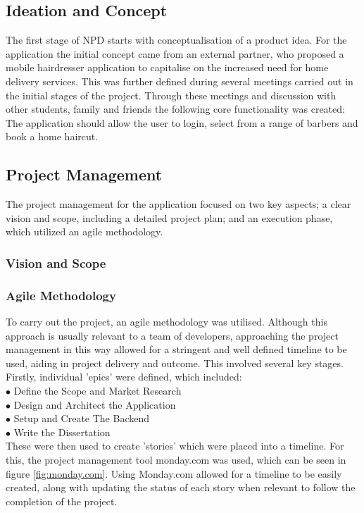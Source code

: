 \documentclass[12pt]{article}
\begin{document}
	
	\subsection{Ideation and Concept}
	The first stage of NPD starts with conceptualisation of a product idea. For the application the initial concept came from an external partner, who proposed a mobile hairdresser application to capitalise on the increased need for home delivery services. This was further defined during several meetings carried out in the initial stages of the project. Through these meetings and discussion with other students, family and friends the following core functionality was created:
	\\
	The application should allow the user to login, select from a range of barbers and book a home haircut.
	
	\subsection{Project Management}

	The project management for the application focused on two key aspects; a clear vision and scope, including a detailed project plan; and an execution phase, which utilized an agile methodology.
	
	\subsubsection{Vision and Scope}
	
	
	\subsubsection{Agile Methodology}
	To carry out the project, an agile methodology was utilised. Although this approach is usually relevant to a team of developers, approaching the project management in this way allowed for a stringent and well defined timeline to be used, aiding in project delivery and outcome. This involved several key stages.
	Firstly, individual 'epics' were defined, which included:
	\\
	$\bullet$ Define the Scope and Market Research
	\\
	$\bullet$ Design and Architect the Application
	\\
	$\bullet$ Setup and Create The Backend
	\\
	$\bullet$ Write the Dissertation
	\\
	
	These were then used to create 'stories' which were placed into a timeline. For this, the project management tool monday.com \cite{monday.com} was used, which can be seen in figure \ref{fig:monday.com}. Using Monday.com allowed for a timeline to be easily created, along with updating the status of each story when relevant to follow the completion of the project.
	
\end{document}

